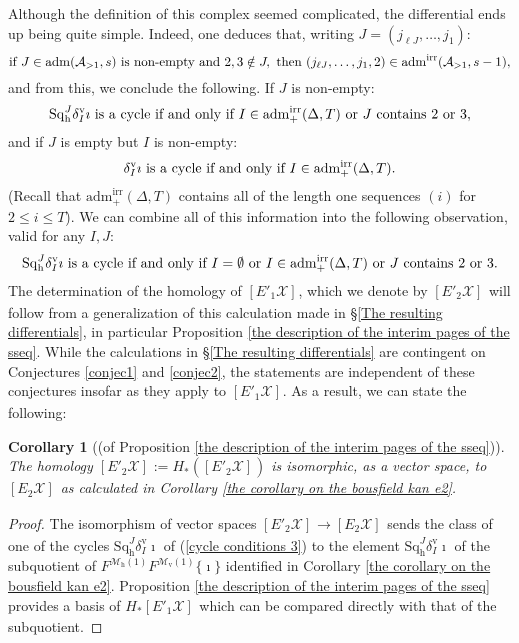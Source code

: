\documentclass[11pt]{amsart} \renewcommand{\baselinestretch}{1.2}
\theoremstyle{plain}
\newtheorem{cor}[thm]{Corollary}
\numberwithin{equation}{section} %
\theoremstyle{plain}
\newtheorem{cor}[thm]{Corollary}
\numberwithin{equation}{chapter} %
\renewcommand{\to}{\longrightarrow}
\newcommand{\calA}{\mathcal{A}}
\newcommand{\calx}{\mathcal{X}}
\newcommand{\calMv}{\mathcal{M}\dver}
\newcommand{\calMh}{\mathcal{M}\dhor}
\newcommand{\LieSteen}{\calA}
\newcommand{\aS}[2][1]{\mathrm{adm}(\LieSteen_{>#1},#2)}
\newcommand{\aSirr}[1]{\mathrm{adm}^\mathrm{irr}(\LieSteen_{>1},#1)}
\newcommand{\aDTirr}{\mathrm{adm}_+^\mathrm{irr}(\Delta,T)}
\newcommand{\Eprime}[5]{[E'_{#2}#3]^{#4}_{#5}}
\newcommand{\E}[5]{[E^{#1}_{#2}#3]^{#4}_{#5}}
\newcommand{\uver}{^\mathrm{v}}
\newcommand{\dver}{_\mathrm{v}}
\newcommand{\dhor}{_\mathrm{h}}
\newcommand{\Sqh}{\mathrm{Sq}\dhor}
\newcommand{\deltav}{\delta\uver}
\begin{document}
\begin{Calculations of HWn}
Although the definition of this complex seemed complicated, the differential ends up being quite simple. Indeed, one deduces that, writing $J=(j_{\ell J},\ldots,j_1)$:
\[
\textup{if }J\in\aS{s}\textup{ is non-empty and } 2,3\notin J,\textup{ then }(j_{\ell J},\ldots,j_1,2)\in\aSirr{s-1},
\]
and from this, we conclude the following. If $J$ is non-empty:
\begin{equation}
\label{cycle conditions 1}
\textup{$\Sqh^J\deltav_I\imath$ is a cycle if and only if $I \in \aDTirr$ or $J$ contains 2 or 3},
\end{equation}
and if $J$ is empty but $I$ is non-empty:
\begin{equation}
\label{cycle conditions 2}
\textup{$\deltav_I\imath$ is a cycle if and only if $I \in \aDTirr$}.\end{equation}
(Recall that $\aDTirr$ contains all of the length one sequences $(i)$ for $2\leq i \leq T$). We can combine all of this information into the following observation, valid for any $I,J$:
\begin{equation}
\label{cycle conditions 3}
\textup{$\Sqh^J\deltav_I\imath$ is a cycle if and only if $I=\emptyset$ or $I \in \aDTirr$ or $J$ contains 2 or 3}.
\end{equation}
The determination of the  homology of $\Eprime{blank}{1}{\calx}{}{}$, which we denote by $\Eprime{blank}{2}{\calx}{}{}$ will follow from a generalization of this calculation made in \S\ref{The resulting differentials}, in particular Proposition \ref{the description of the interim pages of the sseq}. While the calculations in \S\ref{The resulting differentials} are contingent on Conjectures \ref{conjec1} and \ref{conjec2}, the statements are independent of these conjectures insofar as they apply to $\Eprime{blank}{1}{\calx}{}{}$. As a result, we can state the following:
\begin{cor}[(of Proposition \ref{the description of the interim pages of the sseq})]
The homology $\Eprime{blank}{2}{\calx}{}{}:=H_*(\Eprime{blank}{2}{\calx}{}{})$ is isomorphic, as a vector space, to $\E{}{2}{\calx}{}{}$ as calculated in Corollary \ref{the corollary on the bousfield kan e2}.
\end{cor}
\begin{proof}
The isomorphism of vector spaces $\Eprime{blank}{2}{\calx}{}{}\to \E{}{2}{\calx}{}{}$ sends the class of one of the cycles $\Sqh^J\deltav_I\imath$ of (\ref{cycle conditions 3}) to the element $\Sqh^J\deltav_I\imath$ of the subquotient of $F^{\calMh(1)}F^{\calMv(1)}\{\imath\}$ identified  in Corollary \ref{the corollary on the bousfield kan e2}. Proposition \ref{the description of the interim pages of the sseq} provides a basis of $H_*\Eprime{blank}{1}{\calx}{}{}$ which can be compared directly with that of the subquotient.
\end{proof}

\end{Calculations of HWn}
\end{document}
